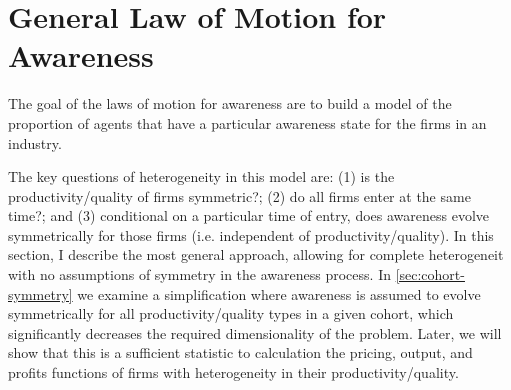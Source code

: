 \documentclass[12pt]{article}
\newtheorem{example}{Example}
\newcommand{\R}{\ensuremath{\mathbb{R}}}
\newcommand{\Q}[0]{\ensuremath{\mathbb{Q}}}
\begin{document}


\section{General Law of Motion for Awareness}
The goal of the laws of motion for awareness are to build a model of the proportion of agents that have a particular awareness state for the firms in an industry.


The key questions of heterogeneity in this model are: (1) is the productivity/quality of firms symmetric?; (2) do all firms enter at the same time?; and (3) conditional on a particular time of entry, does awareness evolve symmetrically for those firms (i.e. independent of productivity/quality).  In this section, I describe the most general approach, allowing for complete heterogeneit with no assumptions of symmetry in the awareness process.  In \cref{sec:cohort-symmetry} we examine a simplification where awareness is assumed to evolve symmetrically for all productivity/quality types in a given cohort, which significantly decreases the required dimensionality of the problem.  Later, we will show that this is a sufficient statistic to calculation the pricing, output, and profits functions of firms with heterogeneity in their productivity/quality.
\end{document}
